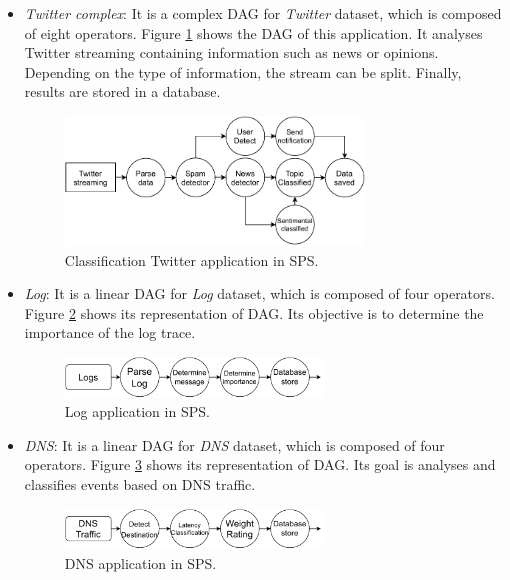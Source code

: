 \begin{itemize}
\item \textit{Twitter complex}: It is a complex DAG for \textit{Twitter} dataset, which is composed of eight operators. Figure \ref{fig:app-twitter-complex} shows the DAG of this application. It analyses Twitter streaming containing information such as news or opinions. Depending on the type of information, the stream can be split. Finally, results are stored in a database.

\begin{figure}[!ht]
\centering
    \includegraphics[width=0.75\textwidth]{figures/exp/App-Twitter-Complex.pdf}
    \caption{Classification Twitter application in SPS.}
    \label{fig:app-twitter-complex}
\end{figure}

\item \textit{Log}: It is a linear DAG for \textit{Log} dataset, which is composed of four operators. Figure \ref{fig:app-log} shows its representation of DAG. Its objective is to determine the importance of the log trace.

\begin{figure}[!ht]
\centering
    \includegraphics[width=0.65\textwidth]{figures/exp/App-Log.pdf}
    \caption{Log application in SPS.}
    \label{fig:app-log}
\end{figure}

\item \textit{DNS}: It is a linear DAG for \textit{DNS} dataset, which is composed of four operators. Figure \ref{fig:app-dns} shows its representation of DAG. Its goal is analyses and classifies events based on DNS traffic.

\begin{figure}[!ht]
\centering
    \includegraphics[width=0.65\textwidth]{figures/exp/App-DNS.pdf}
    \caption{DNS application in SPS.}
    \label{fig:app-dns}
\end{figure}

\end{itemize}

